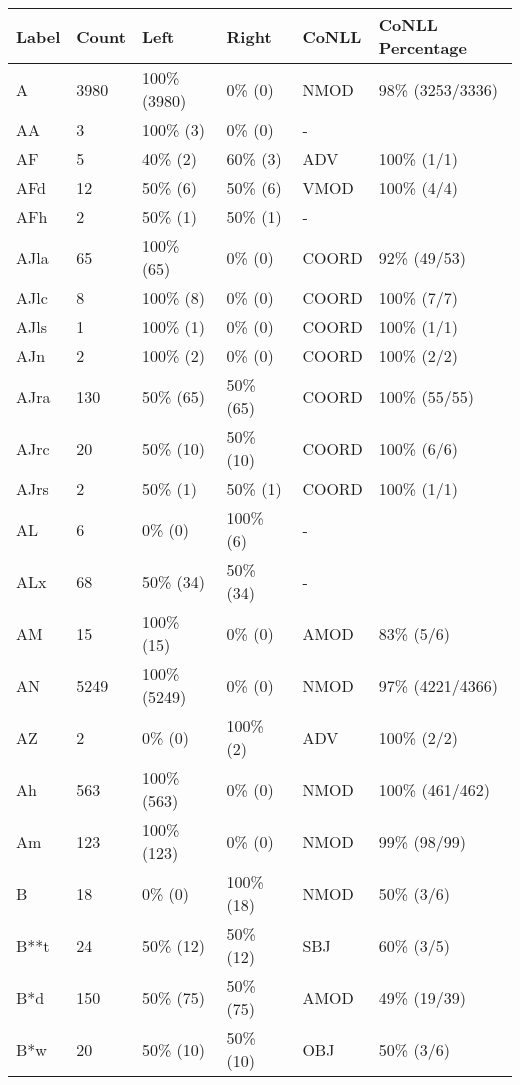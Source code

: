 \begin{figure*}
\begin{tabular}{|l|l|l|l||l|l|}
\hline
Label & Count & Left & Right & CoNLL & CoNLL Percentage\\ 
\hline
 A & 3980 & 100\% (3980) & 0\% (0) & NMOD & 98\% (3253/3336) \\ 
\hline
 AA & 3 & 100\% (3) & 0\% (0) & - &  \\ 
\hline
 AF & 5 & 40\% (2) & 60\% (3) & ADV & 100\% (1/1) \\ 
\hline
 AFd & 12 & 50\% (6) & 50\% (6) & VMOD & 100\% (4/4) \\ 
\hline
 AFh & 2 & 50\% (1) & 50\% (1) & - &  \\ 
\hline
 AJla & 65 & 100\% (65) & 0\% (0) & COORD & 92\% (49/53) \\ 
\hline
 AJlc & 8 & 100\% (8) & 0\% (0) & COORD & 100\% (7/7) \\ 
\hline
 AJls & 1 & 100\% (1) & 0\% (0) & COORD & 100\% (1/1) \\ 
\hline
 AJn & 2 & 100\% (2) & 0\% (0) & COORD & 100\% (2/2) \\ 
\hline
 AJra & 130 & 50\% (65) & 50\% (65) & COORD & 100\% (55/55) \\ 
\hline
 AJrc & 20 & 50\% (10) & 50\% (10) & COORD & 100\% (6/6) \\ 
\hline
 AJrs & 2 & 50\% (1) & 50\% (1) & COORD & 100\% (1/1) \\ 
\hline
 AL & 6 & 0\% (0) & 100\% (6) & - &  \\ 
\hline
 ALx & 68 & 50\% (34) & 50\% (34) & - &  \\ 
\hline
 AM & 15 & 100\% (15) & 0\% (0) & AMOD & 83\% (5/6) \\ 
\hline
 AN & 5249 & 100\% (5249) & 0\% (0) & NMOD & 97\% (4221/4366) \\ 
\hline
 AZ & 2 & 0\% (0) & 100\% (2) & ADV & 100\% (2/2) \\ 
\hline
 Ah & 563 & 100\% (563) & 0\% (0) & NMOD & 100\% (461/462) \\ 
\hline
 Am & 123 & 100\% (123) & 0\% (0) & NMOD & 99\% (98/99) \\ 
\hline
 B & 18 & 0\% (0) & 100\% (18) & NMOD & 50\% (3/6) \\ 
\hline
 B**t & 24 & 50\% (12) & 50\% (12) & SBJ & 60\% (3/5) \\ 
\hline
 B*d & 150 & 50\% (75) & 50\% (75) & AMOD & 49\% (19/39) \\ 
\hline
 B*w & 20 & 50\% (10) & 50\% (10) & OBJ & 50\% (3/6) \\ 

\end{tabular}
\end{figure*}
